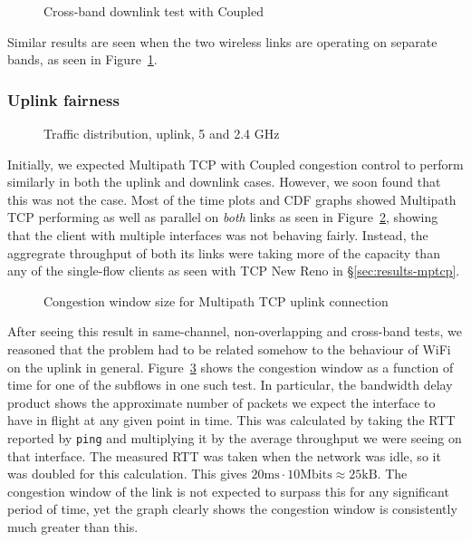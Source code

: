 \begin{figure}[h]
 \centering
 
 \caption{Cross-band downlink test with Coupled}\label{graph:cb-fairness-down}
\end{figure}

Similar results are seen when the two wireless links are operating on separate
bands, as seen in Figure~\ref{graph:cb-fairness-down}.

\subsubsection{Uplink fairness}

\begin{figure}[h]
 \centering
 
 \caption{Traffic distribution, uplink, 5 and 2.4 GHz}\label{graph:up-fair}
\end{figure}

Initially, we expected Multipath TCP with Coupled congestion control to perform
similarly in both the uplink and downlink cases. However, we soon found
that this was not the case. Most of the time plots and CDF graphs showed 
Multipath TCP performing as well as parallel on \emph{both} links as seen in
Figure~\ref{graph:up-fair}, showing that the client with multiple interfaces was
not behaving fairly. Instead, the aggregrate throughput of both its links were taking more of the capacity than any of the single-flow clients as seen with TCP New Reno in \S\ref{sec:results-mptcp}.

\begin{figure}[h]
 \centering
 
 \caption{Congestion window size for Multipath TCP uplink connection}\label{graph:fairness-up-close}
\end{figure}

After seeing this result in same-channel, non-overlapping and cross-band  
tests, we reasoned that the problem had to be related somehow to the 
behaviour of WiFi on the uplink in general. Figure~\ref{graph:fairness-up-close} 
shows the congestion window as a function of time for one of the subflows in one 
such test. In particular, the bandwidth delay product shows the approximate number of packets
we expect the interface to have in flight at any given point in time. This was
calculated by taking the RTT reported by \texttt{ping} and multiplying it by the
average throughput we were seeing on that interface. The measured RTT was taken
when the network was idle, so it was doubled for this calculation. This gives
$20\text{ms} \cdot 10\text{Mbits} \approx 25\text{kB}$. The congestion window of
the link is not expected to surpass this for any significant period of time, yet
the graph clearly shows the congestion window is consistently much greater than
this.

